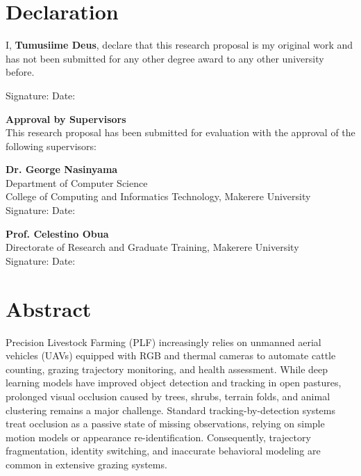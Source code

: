 \documentclass[12pt]{article}
\begin{document}
\pagestyle{plain}
\setcounter{page}{1}

\section*{\centering \textbf{Declaration}}
I, \textbf{Tumusiime Deus}, declare that this research proposal is my original work and has not been submitted for any other degree award to any other university before.

Signature: \underline{\hspace{2.5in}} \hfill Date: \underline{\hspace{1.5in}}

\vspace{1.0in}
\textbf{Approval by Supervisors} \\
This research proposal has been submitted for evaluation with the approval of the following supervisors:

\textbf{Dr. George Nasinyama} \\
Department of Computer Science \\
College of Computing and Informatics Technology, Makerere University \\
Signature: \underline{\hspace{2.5in}} \hfill Date: \underline{\hspace{1.5in}}

\vspace{0.5in}
\textbf{Prof. Celestino Obua} \\
Directorate of Research and Graduate Training, Makerere University \\
Signature: \underline{\hspace{2.5in}} \hfill Date: \underline{\hspace{1.5in}}
\clearpage

\section*{\centering \textbf{Abstract}}
Precision Livestock Farming (PLF) increasingly relies on unmanned aerial vehicles (UAVs) equipped with RGB and thermal cameras to automate cattle counting, grazing trajectory monitoring, and health assessment. While deep learning models have improved object detection and tracking in open pastures, prolonged visual occlusion caused by trees, shrubs, terrain folds, and animal clustering remains a major challenge. Standard tracking-by-detection systems treat occlusion as a passive state of missing observations, relying on simple motion models or appearance re-identification. Consequently, trajectory fragmentation, identity switching, and inaccurate behavioral modeling are common in extensive grazing systems. 
\end{document}
